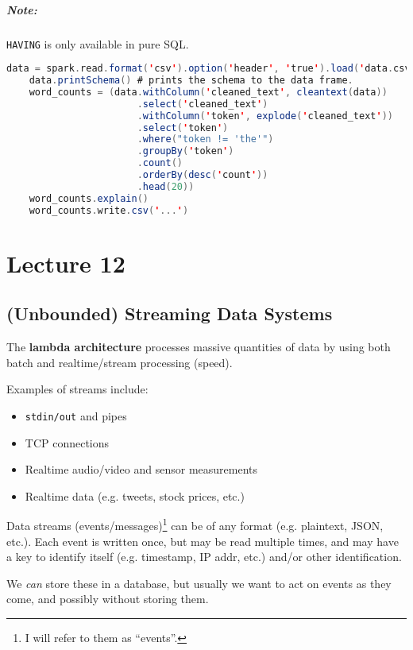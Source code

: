 \documentclass{report}
\newenvironment{definition}[1]{\begin{tcolorbox}[title={Definition: #1}]}{\end{tcolorbox}}
\renewcommand{\bf}[1]{\textbf{{#1}}}
\renewcommand{\tt}[1]{\texttt{{#1}}}
\renewcommand{\it}[1]{\textit{{#1}}}
\begin{document}
\paragraph{Note:} \tt{HAVING} is only available in pure SQL.
\begin{lstlisting}[language=Scala, style=colorEX]
    data = spark.read.format('csv').option('header', 'true').load('data.csv')
    data.printSchema() # prints the schema to the data frame.
    word_counts = (data.withColumn('cleaned_text', cleantext(data))
                       .select('cleaned_text')
                       .withColumn('token', explode('cleaned_text'))
                       .select('token')
                       .where("token != 'the'")
                       .groupBy('token')
                       .count()
                       .orderBy(desc('count'))
                       .head(20))
    word_counts.explain()
    word_counts.write.csv('...')
\end{lstlisting}


\chapter{Lecture 12}
\section{(Unbounded) Streaming Data Systems}
\begin{definition}{Lambda Architecture}
    The \bf{lambda architecture} processes massive quantities of data by using
    both batch and realtime/stream processing (speed).
\end{definition}

Examples of streams include:
\begin{itemize}[label=$\to$]
    \item \tt{stdin/out} and pipes
    \item TCP connections
    \item Realtime audio/video and sensor measurements
    \item Realtime data (e.g. tweets, stock prices, etc.)
\end{itemize}

Data streams (events/messages)\footnote{I will refer to them as ``events''.} can
be of any format (e.g. plaintext, JSON, etc.). Each event is written once, but
may be read multiple times, and may have a key to identify itself (e.g.
timestamp, IP addr, etc.) and/or other
identification.

We \it{can} store these in a database, but usually we want to act on events as
they come, and possibly without storing them.
\end{document}
